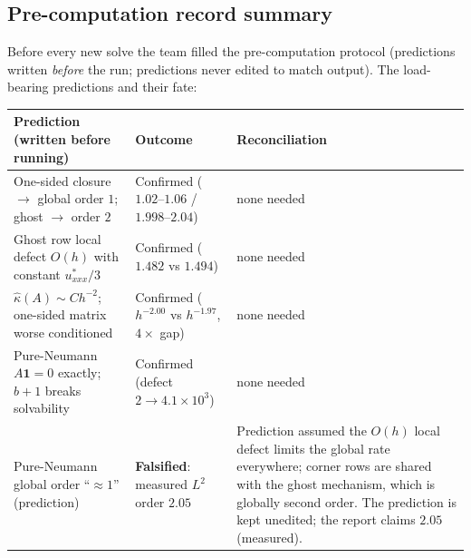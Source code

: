 \documentclass[11pt,a4paper]{article}
\newcommand{\vect}[1]{\mathbf{#1}}
\begin{document}
\subsection*{Pre-computation record summary}
Before every new solve the team filled the pre-computation protocol
(predictions written \emph{before} the run; predictions never edited to
match output).  The load-bearing predictions and their fate:

\begin{center}\small
\begin{tabular}{@{}p{6.4cm}p{3.2cm}p{4.2cm}@{}}
\toprule
Prediction (written before running) & Outcome & Reconciliation \\
\midrule
One-sided closure $\to$ global order $1$; ghost $\to$ order $2$ &
Confirmed ($1.02$--$1.06$ / $1.998$--$2.04$) & none needed \\
Ghost row local defect $O(h)$ with constant $u^*_{xxx}/3$ &
Confirmed ($1.482$ vs $1.494$) & none needed \\
$\hat\kappa(A) \sim C h^{-2}$; one-sided matrix worse conditioned &
Confirmed ($h^{-2.00}$ vs $h^{-1.97}$, $4\times$ gap) & none needed \\
Pure-Neumann $A\vect{1} = 0$ exactly; $b+1$ breaks solvability &
Confirmed (defect $2 \to 4.1\times10^3$) & none needed \\
Pure-Neumann global order ``$\approx 1$'' (prediction) &
\textbf{Falsified}: measured $L^2$ order $2.05$ & Prediction assumed the
$O(h)$ local defect limits the global rate everywhere; corner rows are
shared with the ghost mechanism, which is globally second order.  The
prediction is kept unedited; the report claims $2.05$ (measured). \\
\bottomrule
\end{tabular}
\end{center}
\end{document}
